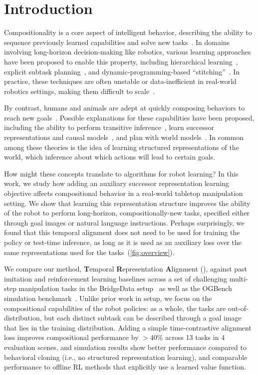 \section{Introduction}
\label{sec:introduction}

Compositionality is a core aspect of intelligent behavior, describing the ability to sequence previously learned capabilities and solve new tasks~\citep{lashley1951problem}.
In domains involving long-horizon decision-making like robotics, various learning approaches have been proposed to enable this property, including hierarchical learning~\citep{kulkarni2016hierarchical}, explicit subtask planning~\citep{schrittwieser2021online,fang2022generalization,ahn2022can}, and dynamic-programming-based ``stitching''~\citep{ghugare2023closing,kostrikov2022offline}.
In practice, these techniques are often unstable or data-inefficient in real-world robotics settings, making them difficult to scale~\citep{laidlaw2024effective}.

By contrast, humans and animals are adept at quickly composing behaviors to reach new goals~\citep{lashley1951problem}.
Possible explanations for these capabilities have been proposed, including the ability to perform transitive inference~\citep{ciranka2022asymmetric}, learn successor representations and causal models~\citep{Dayan1993ImprovingGF,gopnik2017changes}, and plan with world models~\citep{vikbladh2019hippocampal}.
In common among these theories is the idea of learning structured representations of the world, which inference about which actions will lead to certain goals.

How might these concepts translate to algorithms for robot learning?
In this work, we study how adding an auxiliary successor representation learning objective affects compositional behavior in a real-world tabletop manipulation setting.
We show that learning this representation structure improves the ability of the robot to perform long-horizon, compositionally-new tasks, specified either through goal images or natural language instructions.
Perhaps surprisingly, we found that this temporal alignment does not need to be used for training the policy or test-time inference, as long as it is used as an auxiliary loss over the same representations used for the tasks~(\cref{fig:overview}).

We compare our method, \textbf{T}emporal \textbf{R}epresentation \textbf{A}lignment (\Method), against past imitation and reinforcement learning baselines across a set of challenging multi-step manipulation tasks in the BridgeData setup~\citep{walke2023bridgedata} as well as the OGBench simulation benchmark~\citep{park2025ogbench}.
Unlike prior work in setup, we focus on the compositional capabilities of the robot policies: as a whole, the tasks are out-of-distribution, but each distinct subtask can be described through a goal image that lies in the training distribution.
Adding a simple time-contrastive alignment loss improves compositional performance by {$>$40\%} across {13} tasks in 4 evaluation scenes, and simulation results show better performance compared to behavioral cloning (i.e., no structured representation learning), and comparable performance to offline RL methods that explicitly use a learned value function.

